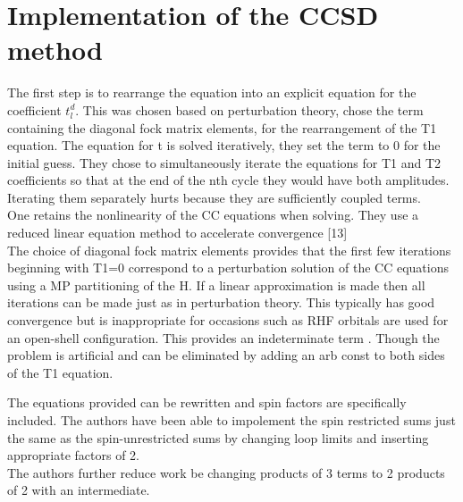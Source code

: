 \documentclass[10pt, draft]{article}
\begin{document}
  \section{Implementation of the CCSD method}
  The first step is to rearrange the equation into an explicit equation for the coefficient $t^d_l$.  This was chosen based on perturbation theory, chose the term containing the diagonal fock matrix elements, for the rearrangement of the T1 equation. The equation for t is solved iteratively, they set the term to 0 for the initial guess.  They chose to simultaneously iterate the equations for T1 and T2 coefficients so that at the end of the nth cycle they would have both amplitudes.  Iterating them separately hurts because they are sufficiently coupled terms.\\
  One retains the nonlinearity of the CC equations when solving.  They use a reduced linear equation method to accelerate convergence [13]\\
  The choice of diagonal fock matrix elements provides that the first few iterations beginning with T1=0 correspond to a perturbation solution of the CC equations using a MP partitioning of the H.  If a linear approximation is made then all iterations can be made just as in perturbation theory.  This typically has good convergence but is inappropriate for occasions such as RHF orbitals are used for an open-shell configuration.  This provides an indeterminate term .  Though the problem is artificial and can be eliminated by adding an arb const to both sides of the T1 equation.\linebreak[1]
  
  The equations provided can be rewritten and spin factors are specifically included.  The authors have been able to impolement the spin restricted sums just the same as the spin-unrestricted sums by changing loop limits and inserting appropriate factors of 2.\\
  The authors further reduce work be changing products of 3 terms to 2 products of 2 with an intermediate.  \\
  
  
  
  
  
\end{document}
